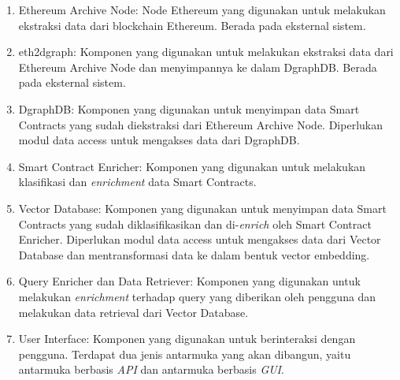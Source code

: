 \begin{enumerate}
    \item Ethereum Archive Node: Node Ethereum yang digunakan untuk melakukan ekstraksi data dari blockchain Ethereum. Berada pada eksternal sistem.
    \item eth2dgraph: Komponen yang digunakan untuk melakukan ekstraksi data dari Ethereum Archive Node dan menyimpannya ke dalam DgraphDB. Berada pada eksternal sistem.
    \item DgraphDB: Komponen yang digunakan untuk menyimpan data Smart Contracts yang sudah diekstraksi dari Ethereum Archive Node. Diperlukan modul data access untuk mengakses data dari DgraphDB.
    \item Smart Contract Enricher: Komponen yang digunakan untuk melakukan klasifikasi dan \textit{enrichment} data Smart Contracts. 
    \item Vector Database: Komponen yang digunakan untuk menyimpan data Smart Contracts yang sudah diklasifikasikan dan di-\textit{enrich} oleh Smart Contract Enricher. Diperlukan modul data access untuk mengakses data dari Vector Database dan mentransformasi data ke dalam bentuk vector embedding.
    \item Query Enricher dan Data Retriever: Komponen yang digunakan untuk melakukan \textit{enrichment} terhadap query yang diberikan oleh pengguna dan melakukan data retrieval dari Vector Database. 
    \item User Interface: Komponen yang digunakan untuk berinteraksi dengan pengguna. Terdapat dua jenis antarmuka yang akan dibangun, yaitu antarmuka berbasis \textit{API} dan antarmuka berbasis \textit{GUI}.
\end{enumerate}














